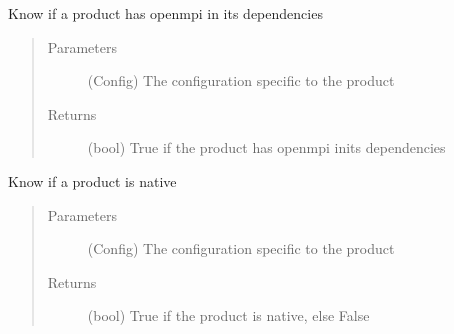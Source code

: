 \documentclass[a4paper,10pt,english]{sphinxmanual}
\begin{document}
\begin{fulllineitems}
\label{\detokenize{apidoc_src/src:src.product.product_is_mpi}}
Know if a product has openmpi in its dependencies
\begin{quote}\begin{description}
\item[{Parameters}] \leavevmode
{} \textendash{} (Config)
The configuration specific to the product

\item[{Returns}] \leavevmode
(bool) 
True if the product has openmpi inits dependencies

\end{description}\end{quote}

\end{fulllineitems}


\begin{fulllineitems}
\label{\detokenize{apidoc_src/src:src.product.product_is_native}}
Know if a product is native
\begin{quote}\begin{description}
\item[{Parameters}] \leavevmode
{} \textendash{} (Config)
The configuration specific to the product

\item[{Returns}] \leavevmode
(bool) 
True if the product is native, else False

\end{description}\end{quote}

\end{fulllineitems}

\end{document}
